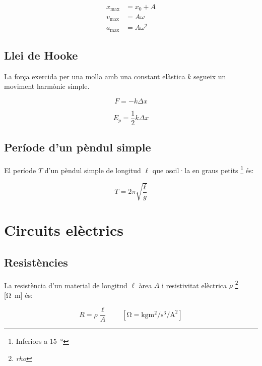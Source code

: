 \begin{align}
    x_\mathrm{max} &= x_0 + A \\
    v_\mathrm{max} &= A\omega \\
    a_\mathrm{max} &= A\omega^2
\end{align}

\subsection{Llei de Hooke}
\label{sub:llei_de_hooke}

La força exercida per una molla amb una constant elàstica $k$ segueix un
moviment harmònic simple.

\begin{equation}
    F = -k\Delta x
\end{equation}

\begin{equation}
    E_p = \frac{1}{2}k\Delta x
\end{equation}

\subsection{Període d'un pèndul simple}
\label{sub:periode_d_un_pendul_simple}

El període $T$ d'un pèndul simple de longitud $\ell$ que oscil·la en graus petits \footnote{Inferiors a \SI{15}{\degree}} és:

\begin{equation}
    T=2\pi\sqrt{\frac{\ell}{g}}
\end{equation}




\section{Circuits elèctrics}
\label{sec:circuits_electrics}

\subsection{Resistències}
\label{sub:resistencies}

La resistència d'un material de longitud $\ell$ àrea $A$ i resistivitat
elèctrica $\rho$ \footnote{\emph{rho}} [\si{\ohm\metre}] és:

\begin{equation}
    R = \rho \frac{\ell}{A} \qquad \left[ \si{\ohm} = \si{\kilo\gram\metre\squared\per\second\cubed\per\ampere\squared} \right]
\end{equation}

